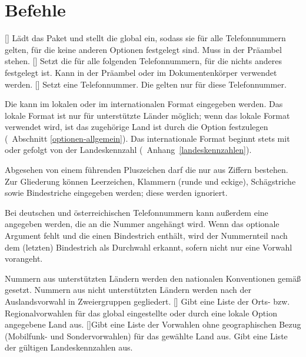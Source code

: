 \documentclass[numbers=noenddot]{scrreprt}
\newcommand*\vglAbschnitt[1]{(\cf\ Abschnitt \ref{#1})}
\newcommand*\vglAnhang[1]{(\cf\ Anhang~\ref{#1})}
\begin{document}
\section{Befehle}
\begin{Befehlsliste}
[]
Lädt das Paket und stellt die  global ein, sodass sie für alle Telefonnummern gelten, für die keine anderen Optionen festgelegt sind. Muss in der Präambel stehen.
[]
Setzt die  für alle folgenden Telefonnummern, für die nichts anderes festgelegt ist. Kann in der Präambel oder im Dokumentenkörper verwendet werden.
[]
Setzt eine Telefonnummer. Die  gelten nur für diese Telefonnummer.

Die  kann im lokalen oder im internationalen Format eingegeben werden. Das lokale Format ist nur für unterstützte Länder möglich; wenn das lokale Format verwendet wird, ist das zugehörige Land ist durch die Option
festzulegen
\vglAbschnitt{optionen-allgemein}.
Das internationale Format beginnt stets mit
\code{+}
oder
gefolgt von der Landeskennzahl
\vglAnhang{landeskennzahlen}.

Abgesehen von einem führenden Pluszeichen darf die  nur aus Ziffern bestehen. Zur Gliederung können Leerzeichen, Klammern (runde und eckige), Schägstriche sowie Bindestriche eingegeben werden; diese werden ignoriert.

Bei deutschen und österreichischen Telefonnummern kann außerdem eine  angegeben werden, die an die Nummer angehängt wird. Wenn das optionale Argument fehlt und die  einen Bindestrich enthält, wird der Nummernteil nach dem (letzten) Bindestrich als Durchwahl erkannt, sofern nicht nur eine Vorwahl vorangeht.

Nummern aus unterstützten Ländern werden den nationalen Konventionen gemäß gesetzt. Nummern aus nicht unterstützten Ländern werden nach der Auslandsvorwahl in Zweiergruppen gegliedert.
[]
Gibt eine Liste der Orts- bzw. Regionalvorwahlen für das global eingestellte oder durch eine lokale Option angegebene Land aus.
[]{Gibt eine Liste der Vorwahlen ohne geographischen Bezug (Mobilfunk- und Sondervorwahlen) für das gewählte Land aus.}
Gibt eine Liste der gültigen Landeskennzahlen aus.
\end{Befehlsliste}
\end{document}
